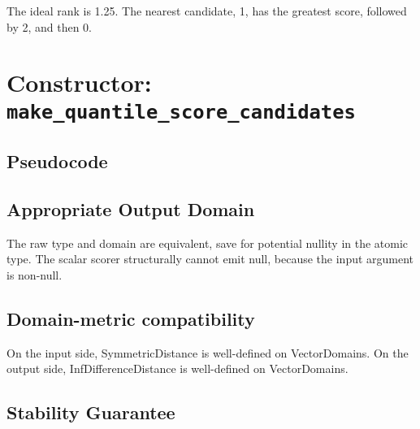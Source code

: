 \documentclass{article}
\begin{document}
The ideal rank is 1.25. The nearest candidate, 1, has the greatest score, followed by 2, and then 0. 

\section{Constructor: \texttt{make\_quantile\_score\_candidates}}

\subsection{Pseudocode}
\label{sec:python-pseudocode}


\subsection{Appropriate Output Domain}
\label{sec:approp-output-domain}
The raw type and domain are equivalent, save for potential nullity in the atomic type. 
The scalar scorer structurally cannot emit null, because the input argument is non-null.

\subsection{Domain-metric compatibility}
On the input side, SymmetricDistance is well-defined on VectorDomains. 
On the output side, InfDifferenceDistance is well-defined on VectorDomains.

\subsection{Stability Guarantee}
\end{document}
